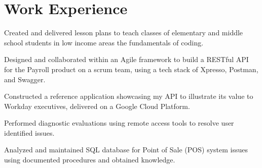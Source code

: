 \documentclass[]{deedy-resume-openfont}
\begin{document}
\hfill
\begin{minipage}[t]{0.66\textwidth} 


\section{Work Experience}


\vspace{\topsep} %
\begin{tightemize}
\item Created and delivered lesson plans to teach classes of elementary and middle school students in low income areas the fundamentals of coding.
\end{tightemize}
\sectionsep


\begin{tightemize}
\item Designed and collaborated within an Agile framework to build a RESTful API for the Payroll product on a scrum team, using a tech stack of Xpresso, Postman, and Swagger. 
\item Constructed a reference application showcasing my API to   illustrate its value to Workday executives, delivered on a Google Cloud Platform. 
\end{tightemize}
\sectionsep



\begin{tightemize}
\item Performed diagnostic evaluations using remote access tools to resolve user identified issues.
\item Analyzed and maintained SQL database for Point of Sale (POS) system issues using documented procedures and obtained knowledge.
\end{tightemize}
\sectionsep




\end{minipage}
\end{document}
